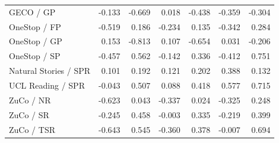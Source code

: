 \begin{table}[p]
\begin{tabular}{lrrrrrr}
GECO / GP & -0.133 & -0.669 & 0.018 & -0.438 & -0.359 & -0.304 \\
OneStop / FP & -0.519 & 0.186 & -0.234 & 0.135 & -0.342 & 0.284 \\
OneStop / GP & 0.153 & -0.813 & 0.107 & -0.654 & 0.031 & -0.206 \\
OneStop / SP & -0.457 & 0.562 & -0.142 & 0.336 & -0.412 & 0.751 \\
Natural Stories / SPR & 0.101 & 0.192 & 0.121 & 0.202 & 0.388 & 0.132 \\
UCL Reading / SPR & -0.043 & 0.507 & 0.088 & 0.418 & 0.577 & 0.715 \\
ZuCo / NR & -0.623 & 0.043 & -0.337 & 0.024 & -0.325 & 0.248 \\
ZuCo / SR & -0.245 & 0.458 & -0.003 & 0.335 & -0.219 & 0.399 \\
ZuCo / TSR & -0.643 & 0.545 & -0.360 & 0.378 & -0.007 & 0.694 \\
\bottomrule
\end{tabular}
\end{table}
